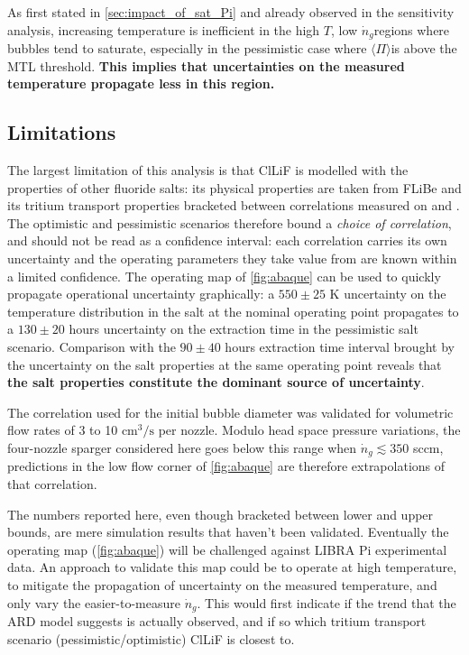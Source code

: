 \documentclass[a4paper,11pt,oneside]{report}
\newcommand{\PI}{\ensuremath{\langle \Pi \rangle}}
\newcommand{\ndotg}{\ensuremath{\dot n_g}}
\begin{document}
As first stated in \cref{sec:impact_of_sat_Pi} and already observed in the sensitivity analysis, increasing temperature is inefficient in the high $T$, low \ndotg regions where bubbles tend to saturate, especially in the pessimistic case where \PI is above the MTL threshold. \textbf{This implies that uncertainties on the measured temperature propagate less in this region.} 

\subsection{Limitations}

The largest limitation of this analysis is that ClLiF is modelled with the properties of other fluoride salts: its physical properties are taken from FLiBe and its tritium transport properties bracketed between correlations measured on  and . The optimistic and pessimistic scenarios therefore bound a \textit{choice of correlation}, and should not be read as a confidence interval: each correlation carries its own uncertainty and the operating parameters they take value from are known within a limited confidence. The operating map of \cref{fig:abaque} can be used to quickly propagate operational uncertainty graphically:  a $550\pm25$ K uncertainty on the temperature distribution in the salt at the nominal operating point propagates to a $130\pm20$ hours uncertainty on the extraction time in the pessimistic salt scenario. Comparison with the $90\pm40$ hours extraction time interval brought by the uncertainty on the salt properties at the same operating point reveals that \textbf{the salt properties constitute the dominant source of uncertainty}.

The correlation used for the initial bubble diameter \cite{kanai_establishment_2017} was validated for volumetric flow rates of 3 to 10 $\mathrm{cm^3/s}$ per nozzle. Modulo head space pressure variations, the four-nozzle sparger considered here goes below this range when $\ndotg\lesssim 350$ sccm, predictions in the low flow corner of \cref{fig:abaque} are therefore extrapolations of that correlation.

The numbers reported here, even though bracketed between lower and upper bounds, are mere simulation results that haven't been validated. Eventually the operating map (\cref{fig:abaque}) will be challenged against LIBRA Pi experimental data. An approach to validate this map could be to operate at high temperature, to mitigate the propagation of uncertainty on the measured temperature, and only vary the easier-to-measure \ndotg. This would first indicate if the trend that the ARD model suggests is actually observed, and if so which tritium transport scenario (pessimistic/optimistic) ClLiF is closest to. 
\end{document}
